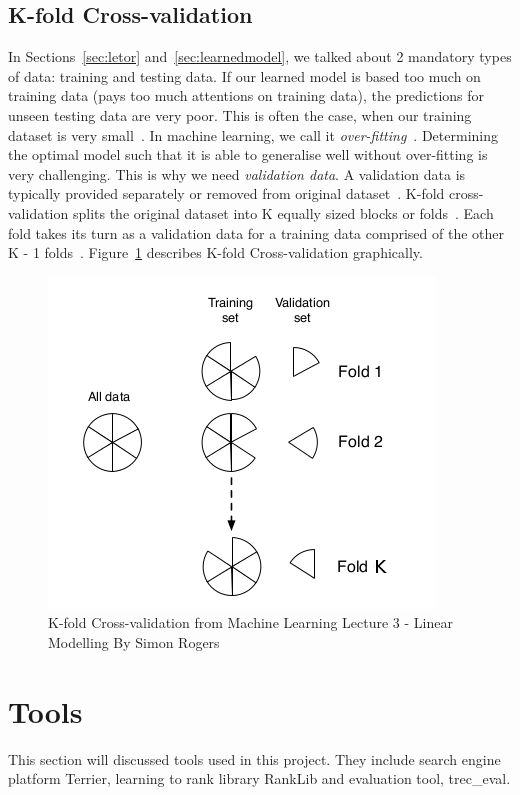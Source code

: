 \subsection{K-fold Cross-validation}\label{sec:kfold}
In Sections~\ref{sec:letor} and~\ref{sec:learnedmodel}, we talked about 2 mandatory types of data: training and testing data. If our learned model is based too much on 
training data (pays too much attentions on training data), the predictions for unseen testing data are very poor. This is often the case, when our training dataset
is very small~\cite{mlSimon}. In machine learning, we call 
it \textit{over-fitting}~\cite[P. 28]{mlSimon}. Determining the optimal model such that it is able to generalise well without over-fitting is very challenging.
This is why we need \textit{validation data}. A validation data is typically provided separately or removed from original dataset~\cite{craig}.
K-fold cross-validation splits the original dataset into K equally sized blocks or folds~\cite{mlSimon}. Each fold takes its turn as a validation data for a
training data comprised of the other K - 1 folds~\cite{mlSimon}. Figure~\ref{fig:crossvalidation} describes K-fold Cross-validation graphically.
\begin{figure}
\centering
\includegraphics[scale=0.4]{./figures/validation.png}
\caption{K-fold Cross-validation from Machine Learning Lecture 3 - Linear Modelling By Simon Rogers}\label{fig:crossvalidation} 
\end{figure}

\section{Tools}\label{sec:tools}
This section will discussed tools used in this project. They include search engine platform Terrier, learning to rank library RankLib and evaluation tool,
trec\_eval.

